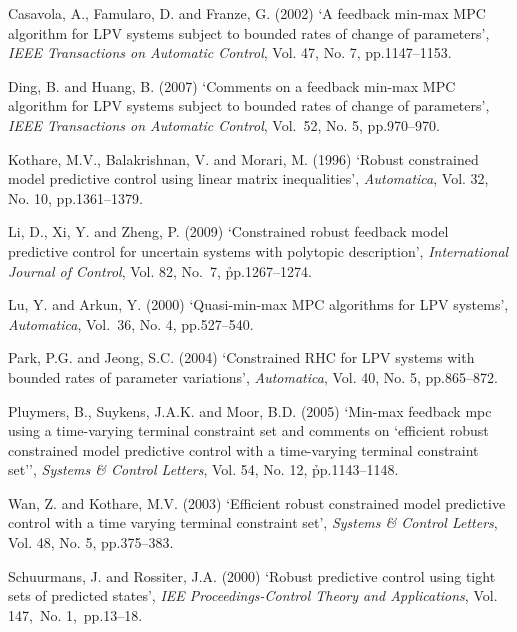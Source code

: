 \documentclass{singlecol-new}
\theoremstyle{TH}{
\newtheorem{lemma}{Lemma}
\newtheorem{theorem}[lemma]{Theorem}
\newtheorem{corrolary}[lemma]{Corrolary}
\newtheorem{conjecture}[lemma]{Conjecture}
\newtheorem{proposition}[lemma]{Proposition}
\newtheorem{claim}[lemma]{Claim}
\newtheorem{stheorem}[lemma]{Wrong Theorem}
\newtheorem{algorithm}{Algorithm}
}
\theoremstyle{THrm}{
\newtheorem{definition}{Definition}[section]
\newtheorem{question}{Question}[section]
\newtheorem{remark}{Remark}
\newtheorem{scheme}{Scheme}
}
\theoremstyle{THhit}{
\newtheorem{case}{Case}[section]
}
\begin{document}
\begin{thebibliography}{10}

Casavola, A., Famularo, D. and Franze, G. (2002) `A feedback min-max
MPC algorithm for LPV systems subject to bounded rates of change of
parameters', {\it IEEE Transactions on Automatic Control}, Vol. 47,
No. 7, pp.1147--1153.

Ding, B. and Huang, B. (2007) `Comments on a feedback min-max MPC
algorithm for LPV systems subject to bounded rates of change of
parameters', {\it IEEE Transactions on Automatic Control}, Vol.~52,
No. 5, pp.970--970.

Kothare, M.V., Balakrishnan, V. and Morari, M. (1996) `Robust
constrained model predictive control using linear matrix
inequalities', {\it Automatica}, Vol. 32, No. 10, pp.1361--1379.

Li, D., Xi, Y. and Zheng, P. (2009) `Constrained robust feedback
model predictive control for uncertain systems with polytopic
description', {\it International Journal of Control}, Vol. 82,
No.~7, \h{pp.1267--1274.}

Lu, Y. and Arkun, Y. (2000) `Quasi-min-max MPC algorithms for LPV
systems', {\it Automatica}, Vol.~36, No. 4, pp.527--540.

Park, P.G. and Jeong, S.C. (2004) `Constrained RHC for LPV systems
with bounded rates of parameter variations', {\it Automatica}, Vol.
40, No. 5, pp.865--872.

Pluymers, B., Suykens, J.A.K. and Moor, B.D. (2005) `Min-max
feedback mpc using a time-varying terminal constraint set and
comments on `efficient robust constrained model predictive control
with a time-varying terminal constraint set'', {\it Systems \&
Control Letters}, Vol. 54, No. 12, \h{pp.1143--1148.}

Wan, Z. and Kothare, M.V. (2003) `Efficient robust constrained model
predictive control with a time varying terminal constraint set',
{\it Systems \& Control Letters}, Vol. 48, No. 5, pp.375--383.

Schuurmans, J. and Rossiter, J.A. (2000) `Robust predictive control
using tight sets of predicted states', {\it IEE Proceedings-Control
Theory and Applications}, Vol. 147,~No. 1,~pp.13--18.
\end{thebibliography}
\end{document}
